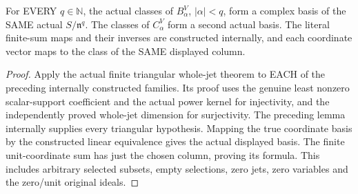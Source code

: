 \begin{theorem}
\label{hir:actual-selected-vertex-whole-jet-bases}
For EVERY $q\in\mathbb N$, the actual classes of $B^V_\alpha$,
$|\alpha|<q$, form a complex basis of the SAME actual $S/\mathfrak n^q$.
The classes of $C^V_\alpha$ form a second actual basis. The literal
finite-sum maps and their inverses are constructed internally, and
each coordinate vector maps to the class of the SAME displayed column.
\leanok
\end{theorem}
\begin{proof}
Apply the actual finite triangular whole-jet theorem to EACH of the
preceding internally constructed families. Its proof uses the genuine
least nonzero scalar-support coefficient and the actual power kernel
for injectivity, and the independently proved whole-jet dimension for
surjectivity. The preceding lemma internally supplies every triangular
hypothesis. Mapping the true coordinate basis by the constructed
linear equivalence gives the actual displayed basis. The finite
unit-coordinate sum has just the chosen column, proving its formula.
This includes arbitrary selected subsets, empty selections, zero jets,
zero variables and the zero/unit original ideals.
\end{proof}

